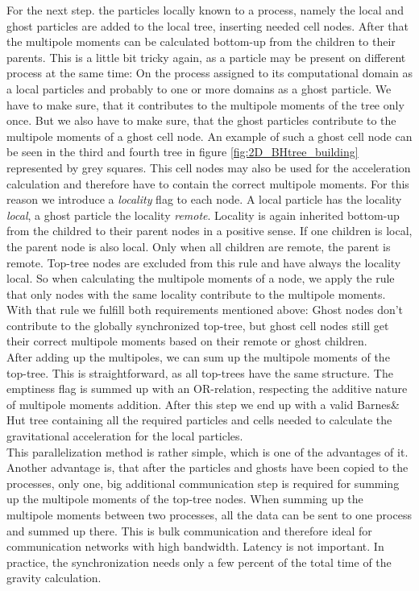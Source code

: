 For the next step. the particles locally known to a process, namely the local and ghost particles are added to the local tree, inserting needed cell nodes. After that the multipole moments can be calculated bottom-up from the children to their parents. This is a little bit tricky again, as a particle may be present on different process at the same time: On the process assigned to its computational domain as a local particles and probably to one or more domains as a ghost particle. We have to make sure, that it contributes to the multipole moments of the tree only once. But we also have to make sure, that the ghost particles contribute to the multipole moments of a ghost cell node. An example of such a ghost cell node can be seen in the third and fourth tree in figure \ref{fig:2D_BHtree_building} represented by grey squares. This cell nodes may also be used for the acceleration calculation and therefore have to contain the correct multipole moments. For this reason we introduce a \emph{locality} flag to each node. A local particle has the locality \emph{local}, a ghost particle the locality \emph{remote}. Locality is again inherited bottom-up from the childred to their parent nodes in a positive sense. If one children is local, the parent node is also local. Only when all children are remote, the parent is remote. Top-tree nodes are excluded from this rule and have always the locality local. So when calculating the multipole moments of a node, we apply the rule that only nodes with the same locality contribute to the multipole moments. With that rule we fulfill both requirements mentioned above: Ghost nodes don't contribute to the globally synchronized top-tree, but ghost cell nodes still get their correct multipole moments based on their remote or ghost children.\\

After adding up the multipoles, we can sum up the multipole moments of the top-tree. This is straightforward, as all top-trees have the same structure. The emptiness flag is summed up with an OR-relation, respecting the additive nature of multipole moments addition. After this step we end up with a valid Barnes\& Hut tree containing all the required particles and cells needed to calculate the gravitational acceleration for the local particles.\\

This parallelization method is rather simple, which is one of the advantages of it. Another advantage is, that after the particles and ghosts have been copied to the processes, only one, big additional communication step is required for summing up the multipole moments of the top-tree nodes. When summing up the multipole moments between two processes, all the data can be sent to one process and summed up there. This is bulk communication and therefore ideal for communication networks with high bandwidth. Latency is not important. In practice, the synchronization needs only a few percent of the total time of the gravity calculation.\\

